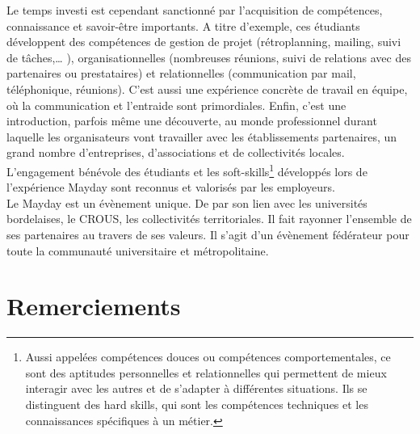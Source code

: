 \documentclass[12pt,a4paper]{report}
\begin{document}
\sloppy Le temps investi est cependant sanctionné par l'acquisition de compétences, connaissance et savoir-être importants. A titre d'exemple, ces étudiants développent des compétences de gestion de projet (rétroplanning, mailing, suivi de tâches,… ), organisationnelles (nombreuses réunions, suivi de relations avec des partenaires ou prestataires) et relationnelles (communication par mail, téléphonique, réunions). C’est aussi une expérience concrète de travail en équipe, où la communication et l'entraide sont primordiales. Enfin, c’est une introduction, parfois même une découverte, au monde professionnel durant laquelle les organisateurs vont travailler avec les établissements partenaires, un grand nombre d'entreprises, d’associations et de collectivités locales.\\

L’engagement bénévole des étudiants et les soft-skills\footnote{ Aussi appelées compétences douces ou compétences comportementales, ce sont des aptitudes personnelles et relationnelles qui permettent de mieux interagir avec les autres et de s'adapter à différentes situations. Ils se distinguent des hard skills, qui sont les compétences techniques et les connaissances spécifiques à un métier.} développés lors de l’expérience Mayday sont reconnus et valorisés par les employeurs.\\

Le Mayday est un évènement unique. De par son lien avec les universités bordelaises, le CROUS, les collectivités territoriales. Il fait rayonner l'ensemble de ses partenaires au travers de ses valeurs. Il s’agit d’un évènement fédérateur pour toute la communauté universitaire et métropolitaine.

\newpage
\section*{Remerciements}
\end{document}
